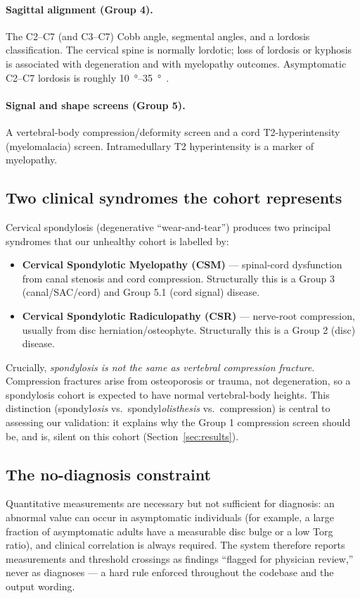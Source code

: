 \paragraph{Sagittal alignment (Group 4).} The C2--C7 (and C3--C7) Cobb angle, segmental angles, and a
lordosis classification. The cervical spine is normally lordotic; loss of lordosis or kyphosis is
associated with degeneration and with myelopathy outcomes. Asymptomatic C2--C7 lordosis is roughly
\SIrange{10}{35}{\degree}~\cite{nassj2025}.

\paragraph{Signal and shape screens (Group 5).} A vertebral-body compression/deformity screen and a cord
T2-hyperintensity (myelomalacia) screen. Intramedullary T2 hyperintensity is a marker of myelopathy.

\subsection{Two clinical syndromes the cohort represents}
Cervical spondylosis (degenerative ``wear-and-tear'') produces two principal syndromes that our
unhealthy cohort is labelled by:
\begin{itemize}[leftmargin=*]
  \item \textbf{Cervical Spondylotic Myelopathy (CSM)} --- spinal-cord dysfunction from canal stenosis
  and cord compression. Structurally this is a Group 3 (canal/SAC/cord) and Group 5.1 (cord signal)
  disease.
  \item \textbf{Cervical Spondylotic Radiculopathy (CSR)} --- nerve-root compression, usually from disc
  herniation/osteophyte. Structurally this is a Group 2 (disc) disease.
\end{itemize}
Crucially, \emph{spondylosis is not the same as vertebral compression fracture}. Compression fractures
arise from osteoporosis or trauma, not degeneration, so a spondylosis cohort is expected to have normal
vertebral-body heights. This distinction (spondyl\emph{osis} vs.\ spondyl\emph{olisthesis} vs.\
compression) is central to assessing our validation: it explains why the Group 1 compression screen
should be, and is, silent on this cohort (Section~\ref{sec:results}).

\subsection{The no-diagnosis constraint}
Quantitative measurements are necessary but not sufficient for diagnosis: an abnormal value can occur in
asymptomatic individuals (for example, a large fraction of asymptomatic adults have a measurable disc
bulge or a low Torg ratio), and clinical correlation is always required. The system therefore reports
measurements and threshold crossings as findings ``flagged for physician review,'' never as diagnoses ---
a hard rule enforced throughout the codebase and the output wording.
